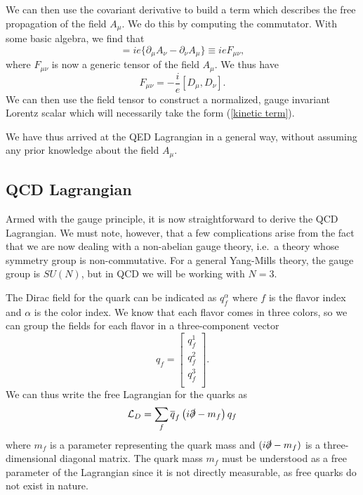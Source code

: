 \documentclass[10pt,a4paper]{book}
\begin{document}
We can then use the covariant derivative to build a term which describes the free propagation of the field $A_\mu$. We do this by computing the commutator. With some basic algebra, we find that 
\begin{equation}
[D_\mu, D_\nu] = ie \lbrace \partial_\mu A_\nu - \partial_\nu A_\mu \rbrace \equiv ie F_{\mu\nu},
\end{equation}
where $F_{\mu \nu}$ is now a generic tensor of the field $A_\mu$. We thus have
\begin{equation}
F_{\mu \nu} = -\frac{i}{e}[D_\mu, D_\nu].
\end{equation}
We can then use the field tensor to construct a normalized, gauge invariant Lorentz scalar which will necessarily take the form (\ref{kinetic term}).

We have thus arrived at the QED Lagrangian in a general way, without assuming any prior knowledge about the field $A_\mu$. 

\subsection{QCD Lagrangian}

Armed with the gauge principle, it is now straightforward to derive the QCD Lagrangian. We must note, however, that a few complications arise from the fact that we are now dealing with a non-abelian gauge theory, i.e.\ a theory whose symmetry group is non-commutative. For a general Yang-Mills theory, the gauge group is $SU(N)$, but in QCD we will be working with $N = 3$. 

The Dirac field for the quark can be indicated as $q_f^\alpha$ where $f$ is the flavor index and $\alpha$ is the color index. We know that each flavor comes in three colors, so we can group the fields for each flavor in a three-component vector
\begin{equation}
q_f = 	\begin{bmatrix} 	
		q^1_f \\ 
		q^2_f \\
		q^3_f \\
		\end{bmatrix}.
\end{equation}
We can thus write the free Lagrangian for the quarks as 
\begin{equation}
\mathcal{L}_D = \sum_f\overline{q}_f\left(i\slashed{\partial} - m_f\right)q_f
\end{equation}
where $m_f$ is a parameter representing the quark mass and $(i\slashed{\partial} - m_f)$ is a three-dimensional diagonal matrix. The quark mass $m_f$ must be understood as a free parameter of the Lagrangian since it is not directly measurable, as free quarks do not exist in nature.
\end{document}
